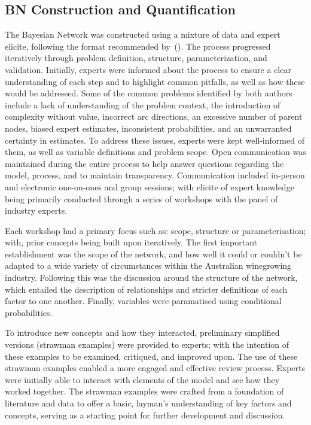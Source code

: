 \documentclass[fleqn,10pt]{wlscirep}
\begin{document}
\subsection*{BN Construction and Quantification}

The Bayesian Network was constructed using a mixture of data and expert elicite, following the format recommended by~(\cite{korbBayesianArtificialIntelligence2011,pitchforthProposedValidationFramework2013}). The process progressed iteratively through problem definition, structure, parameterization, and validation. Initially, experts were informed about the process to ensure a clear understanding of each step and to highlight common pitfalls, as well as how these would be addressed. Some of the common problems identified by both authors include a lack of understanding of the problem context, the introduction of complexity without value, incorrect arc directions, an excessive number of parent nodes, biased expert estimates, inconsistent probabilities, and an unwarranted certainty in estimates. To address these issues, experts were kept well-informed of them, as well as variable definitions and problem scope. Open communication was maintained during the entire process to help answer questions regarding the model, process, and to maintain transparency. Communication included in-person and electronic one-on-ones and group sessions; with elicite of expert knowledge being primarily conducted through a series of workshops with the panel of industry experts.

Each workshop had a primary focus such as: scope, structure or parameterisation; with, prior concepts being built upon iteratively. The first important establishment was the scope of the network, and how well it could or couldn't be adapted to a wide variety of circumstances within the Australian winegrowing industry. Following this was the discussion around the structure of the network, which entailed the description of relationships and stricter definitions of each factor to one another. Finally, variables were paramatised using conditional probabilities.

To introduce new concepts and how they interacted, preliminary simplified versions (strawman examples) were provided to experts; with the intention of these examples to be examined, critiqued, and improved upon. The use of these strawman examples enabled a more engaged and effective review process. Experts were initially able to interact with elements of the model and see how they worked together. The strawman examples were crafted from a foundation of literature and data to offer a basic, layman's understanding of key factors and concepts, serving as a starting point for further development and discussion. 
\end{document}
